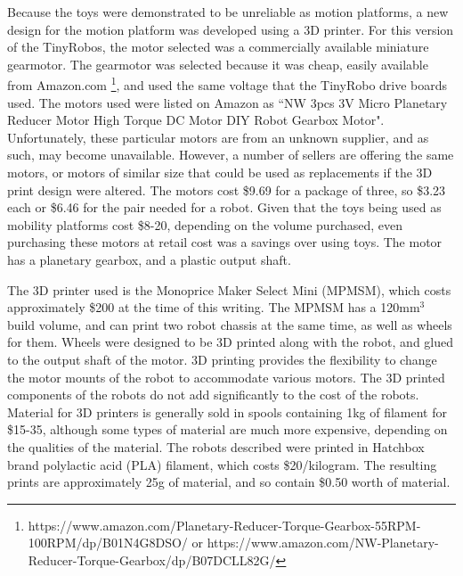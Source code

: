 Because the toys were demonstrated to be unreliable as motion platforms, a new design for the motion platform was developed using a 3D printer. 
For this version of the TinyRobos, the motor selected was a commercially available miniature gearmotor. 
The gearmotor was selected because it was cheap, easily available from Amazon.com \footnote{https://www.amazon.com/Planetary-Reducer-Torque-Gearbox-55RPM-100RPM/dp/B01N4G8DSO/ or https://www.amazon.com/NW-Planetary-Reducer-Torque-Gearbox/dp/B07DCLL82G/}, and used the same voltage that the TinyRobo drive boards used. 
The motors used were listed on Amazon as ``NW 3pcs 3V Micro Planetary Reducer Motor High Torque DC Motor DIY Robot Gearbox Motor". 
Unfortunately, these particular motors are from an unknown supplier, and as such, may become unavailable. 
However, a number of sellers are offering the same motors, or motors of similar size that could be used as replacements if the 3D print design were altered. 
The motors cost \$9.69 for a package of three, so \$3.23 each or \$6.46 for the pair needed for a robot. 
Given that the toys being used as mobility platforms cost \$8-20, depending on the volume purchased, even purchasing these motors at retail cost was a savings over using toys.
The motor has a planetary gearbox, and a plastic output shaft. 

The 3D printer used is the Monoprice Maker Select Mini (MPMSM), which costs approximately \$200 at the time of this writing.
The MPMSM has a 120mm$^3$ build volume, and can print two robot chassis at the same time, as well as wheels for them.
Wheels were designed to be 3D printed along with the robot, and glued to the output shaft of the motor. 
3D printing provides the flexibility to change the motor mounts of the robot to accommodate various motors. 
The 3D printed components of the robots do not add significantly to the cost of the robots. 
Material for 3D printers is generally sold in spools containing 1kg of filament for \$15-35, although some types of material are much more expensive, depending on the qualities of the material.
The robots described were printed in Hatchbox brand polylactic acid (PLA) filament, which costs \$20/kilogram. 
The resulting prints are approximately 25g of material, and so contain \$0.50 worth of material. 

